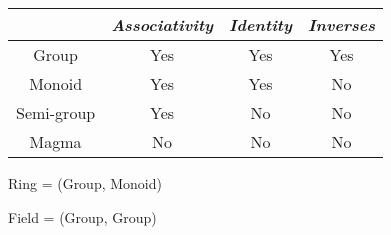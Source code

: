 \documentclass[11pt,a4paper]{article}
\begin{document}
\begin{tabular}{cccc}
    \toprule
               & \emph{Associativity} & \emph{Identity} & \emph{Inverses} \\
               \midrule
    Group      & Yes                  & Yes             & Yes \\
    Monoid     & Yes                  & Yes             & No  \\
    Semi-group & Yes                  & No              & No  \\
    Magma      & No                   & No              & No  \\
    \bottomrule
\end{tabular}

Ring  = (Group, Monoid)

Field = (Group, Group)
\end{document}

